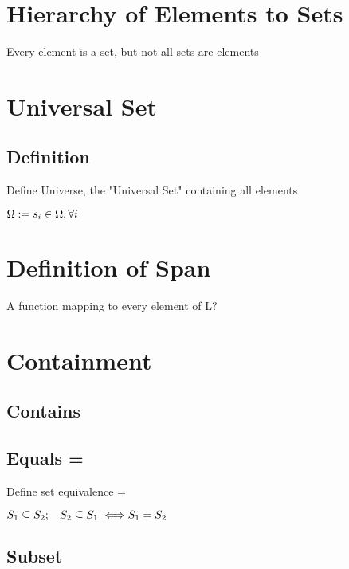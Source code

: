 \documentclass[11pt]{article}
\begin{document}
\section{Hierarchy of Elements to Sets}
Every element is a set, but not all sets are elements


\section{Universal Set}

\subsection{Definition}
Define Universe, the "Universal Set" containing all elements
\begin{center}
$
\Omega := s_i \in \Omega, \forall i \hspace{5mm}
$
\end{center}





\section{Definition of Span}
A function mapping to every element of L?





\section{Containment}
\subsection{Contains}
\subsection{Equals = }
Define set equivalence  =
\begin{center}
$
S_1 \subseteq S_2 ; \hspace{3mm} S_2 \subseteq S_1 \hspace{1mm} \Longleftrightarrow S_1 = S_2 \hspace{3mm}
$
\end{center}


\subsection{Subset}
\end{document}
